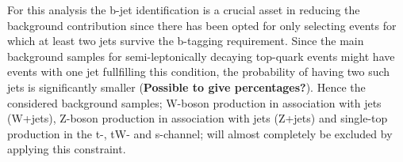 For this analysis the b-jet identification is a crucial asset in reducing the background contribution since there has been opted for only selecting events for which at least two jets survive the b-tagging requirement. Since the main background samples for semi-leptonically decaying top-quark events might have events with one jet fullfilling this condition, the probability of having two such jets is significantly smaller (\textbf{Possible to give percentages?}). Hence the considered background samples; W-boson production in association with jets (W+jets), Z-boson production in association with jets (Z+jets) and single-top production in the t-, tW- and s-channel; will almost completely be excluded by applying this constraint.
\\

